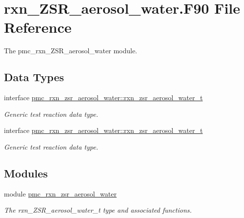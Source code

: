 \hypertarget{rxn___z_s_r__aerosol__water_8_f90}{}\section{rxn\+\_\+\+Z\+S\+R\+\_\+aerosol\+\_\+water.\+F90 File Reference}
\label{rxn___z_s_r__aerosol__water_8_f90}


The pmc\+\_\+rxn\+\_\+\+Z\+S\+R\+\_\+aerosol\+\_\+water module.  


\subsection*{Data Types}
\begin{DoxyCompactItemize}
\item 
interface \mbox{\hyperlink{structpmc__rxn__zsr__aerosol__water_1_1rxn__zsr__aerosol__water__t}{pmc\+\_\+rxn\+\_\+zsr\+\_\+aerosol\+\_\+water\+::rxn\+\_\+zsr\+\_\+aerosol\+\_\+water\+\_\+t}}
\begin{DoxyCompactList}\small\item\em Generic test reaction data type. \end{DoxyCompactList}\item 
interface \mbox{\hyperlink{structpmc__rxn__zsr__aerosol__water_1_1rxn__zsr__aerosol__water__t}{pmc\+\_\+rxn\+\_\+zsr\+\_\+aerosol\+\_\+water\+::rxn\+\_\+zsr\+\_\+aerosol\+\_\+water\+\_\+t}}
\begin{DoxyCompactList}\small\item\em Generic test reaction data type. \end{DoxyCompactList}\end{DoxyCompactItemize}
\subsection*{Modules}
\begin{DoxyCompactItemize}
\item 
module \mbox{\hyperlink{namespacepmc__rxn__zsr__aerosol__water}{pmc\+\_\+rxn\+\_\+zsr\+\_\+aerosol\+\_\+water}}
\begin{DoxyCompactList}\small\item\em The rxn\+\_\+\+Z\+S\+R\+\_\+aerosol\+\_\+water\+\_\+t type and associated functions. \end{DoxyCompactList}\end{DoxyCompactItemize}
